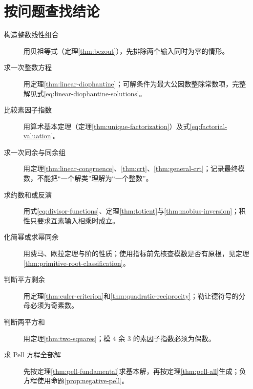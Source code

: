 \section{按问题查找结论}
\begin{description}
 \item[构造整数线性组合] 用贝祖等式（定理\ref{thm:bezout}），先排除两个输入同时为零的情形。
 \item[求一次整数方程] 用定理\ref{thm:linear-diophantine}；可解条件为最大公因数整除常数项，完整解见式\eqref{eq:linear-diophantine-solutions}。
 \item[比较素因子指数] 用算术基本定理（定理\ref{thm:unique-factorization}）及式\eqref{eq:factorial-valuation}。
 \item[求一次同余与同余组] 用定理\ref{thm:linear-congruence}、\ref{thm:crt}、\ref{thm:general-crt}；记录最终模数，不能把“一个解类”理解为“一个整数”。
 \item[求约数和或反演] 用式\eqref{eq:divisor-functions}、定理\ref{thm:totient}与\ref{thm:mobius-inversion}；积性只要求互素输入相乘时成立。
 \item[化简幂或求幂同余] 用费马、欧拉定理与阶的性质；使用指标前先核查模数是否有原根，见定理\ref{thm:primitive-root-classification}。
 \item[判断平方剩余] 用定理\ref{thm:euler-criterion}和\ref{thm:quadratic-reciprocity}；勒让德符号的分母必须为奇素数。
 \item[判断两平方和] 用定理\ref{thm:two-squares}；模 $4$ 余 $3$ 的素因子指数必须为偶数。
 \item[求 Pell 方程全部解] 先按定理\ref{thm:pell-fundamental}求基本解，再按定理\ref{thm:pell-all}生成；负方程使用命题\ref{prop:negative-pell}。
\end{description}

